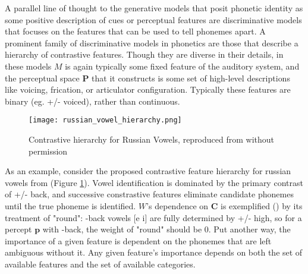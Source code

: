 \begin{multicols}{2}

A parallel line of thought to the generative models that posit phonetic identity as some positive description of cues or perceptual features are discriminative models that focuses on the features that can be used to tell phonemes apart. A prominent family of discriminative models in phonetics are those that describe a hierarchy of contrastive features\cite{Dresher2008,clementsFeatureOrganization2006,halleFeatureSpreadingRepresentation2000}. Though they are diverse in their details, in these models $M$ is again typically some fixed feature of the auditory system, and the perceptual space $\mathbf{P}$ that it constructs is some set of high-level descriptions like voicing, frication, or articulator configuration. Typically these features are binary (eg. +/- voiced), rather than continuous.

\begin{figure}[H]
\texttt{[image: russian\_vowel\_hierarchy.png]}
\caption{Contrastive hierarchy for Russian Vowels, reproduced from \cite{iosadVowelReductionRussian2012} without permission}
\label{fig:hierarchy}
\end{figure}

As an example, consider the proposed contrastive feature hierarchy for russian vowels from \cite{iosadVowelReductionRussian2012} (Figure \ref{fig:hierarchy}). Vowel identification is dominated by the primary contrast of +/- back, and successive constrastive features eliminate candidate phonemes until the true phoneme is identified. $W$'s dependence on $\mathbf{C}$ is exemplified () by its treatment of "round": -back vowels [e i] are fully determined by +/- high, so for a percept $\mathbf{p}$ with -back, the weight of "round" should be 0. Put another way, the importance of a given feature is dependent on the phonemes that are left ambiguous without it. Any given feature's importance depends on both the set of available features and the set of available categories. 



\end{multicols}
